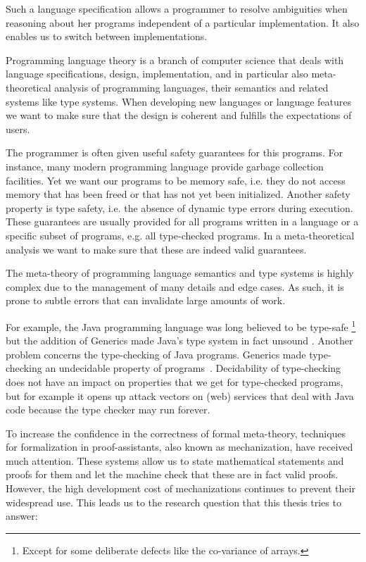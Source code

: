 {Such a language specification allows a programmer to resolve ambiguities when
reasoning about her programs independent of a particular implementation. It also
enables us to switch between implementations.

Programming language theory is a branch of computer science that deals with
language specifications, design, implementation, and in particular also
meta-theoretical analysis of programming languages, their semantics and related
systems like type systems. When developing new languages or language features we
want to make sure that the design is coherent and fulfills the expectations of
users.

The programmer is often given useful safety guarantees for this programs. For
instance, many modern programming language provide garbage collection
facilities. Yet we want our programs to be memory safe, i.e. they do not access
memory that has been freed or that has not yet been initialized. Another safety
property is type safety, i.e. the absence of dynamic type errors during
execution. These guarantees are usually provided for all programs written in a
language or a specific subset of programs, e.g. all type-checked programs. In a
meta-theoretical analysis we want to make sure that these are indeed valid
guarantees.

The meta-theory of programming language semantics and type systems is highly
complex due to the management of many details and edge cases. As such, it is
prone to subtle errors that can invalidate large amounts of work.

For example, the Java programming language was long believed to be type-safe
\footnote{Except for some deliberate defects like the co-variance of arrays.}
but the addition of Generics made Java's type system in fact unsound
\cite{amin2016java}. Another problem concerns the type-checking of Java
programs. Generics made type-checking an undecidable property of
programs~\cite{grigore2017}. Decidability of type-checking does not have an
impact on properties that we get for type-checked programs, but for example it
opens up attack vectors on (web) services that deal with Java code because the
type checker may run forever.

To increase the confidence in the correctness of formal meta-theory, techniques
for formalization in proof-assistants, also known as mechanization, have
received much attention. These systems allow us to state mathematical statements
and proofs for them and let the machine check that these are in fact valid
proofs. However, the high development cost of mechanizations continues to
prevent their widespread use. This leads us to the research question that this
thesis tries to answer:

}
